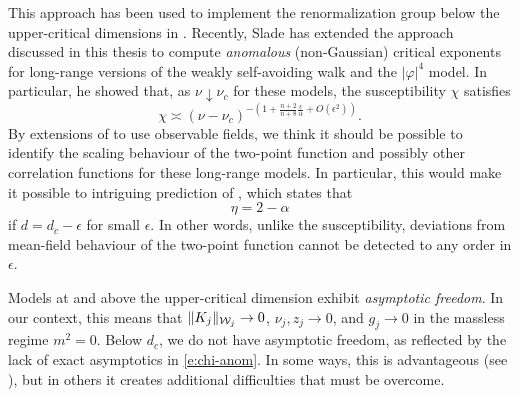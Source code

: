 
This approach has been used to implement the renormalization group below the
upper-critical dimensions in \cite{BDH98,MS00,BMS03,Abde07}. Recently, Slade
\cite{Slad17} has extended the approach discussed in this thesis to compute
\emph{anomalous} (non-Gaussian) critical exponents for long-range versions of
the weakly self-avoiding walk and the $|\varphi|^4$ model. In particular, he
showed that, as $\nu\downarrow\nu_c$ for these models, the susceptibility $\chi$
satisfies
\begin{equation}
\label{e:chi-anom}
\chi
	\asymp
(\nu - \nu_c)^{-\left(1 + \tfrac{n+2}{n+8} \tfrac{\epsilon}{\alpha} + O(\epsilon^2)\right)}.
\end{equation}
By extensions of \cite{Slad17} to use observable fields, we think it should
be possible to identify the scaling behaviour of the two-point function and possibly
other correlation functions for these long-range models. In particular, this would
make it possible to  intriguing prediction of \cite{FMN72}, which
states that
\begin{equation}
\eta = 2 - \alpha
\end{equation}
if $d = d_c - \epsilon$ for small $\epsilon$. In other words, unlike the susceptibility,
deviations from mean-field behaviour of the two-point function cannot be detected
to any order in $\epsilon$.

\begin{rk}
Models at and above the upper-critical dimension exhibit \emph{asymptotic freedom}.
In our context, this means that $\|K_j\|_{\mathcal{W}_j} \rightarrow 0$,
$\nu_j, z_j \to 0$, and $g_j \to 0$ in the massless regime $m^2 = 0$. Below $d_c$, we do
not have asymptotic freedom, as reflected by the lack of exact asymptotics in
\eqref{e:chi-anom}. In some ways, this is advantageous (see \cite{Slad17}), but
in others it creates additional difficulties that must be overcome.
\end{rk}

